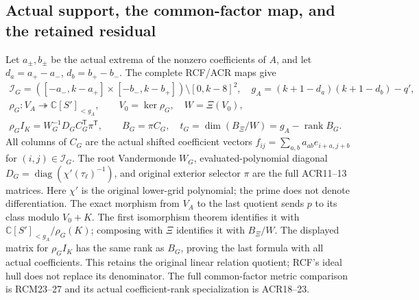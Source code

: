 \documentclass[11pt,a4paper]{article}
\providecommand{\C}{\mathbb C}
\begin{document}
\subsection{Actual support, the common-factor map, and the retained residual}

Let $a_\pm,b_\pm$ be the actual extrema of the nonzero coefficients
of $A$, and let $d_a=a_+-a_-$, $d_b=b_+-b_-$.
The complete RCF/ACR maps give
\[
\begin{gathered}
 \mathcal I_G=
 ([-a_-,k-a_+]\times[-b_-,k-b_+])\setminus[0,k-8]^2,\quad
 g_A=(k+1-d_a)(k+1-d_b)-q',\\
 \rho_G:V_A\twoheadrightarrow\C[S']_{<g_A},\qquad
 V_0=\ker\rho_G,\quad W=\Xi(V_0),\\
 \rho_G I_K=W_G^{-1}D_GC_G^{\mathsf T}\pi^{\mathsf T},
 \qquad B_G=\pi C_G,\quad
 t_G=\dim(B_\Xi/W)=g_A-\operatorname{rank}B_G .
\end{gathered}\tag{PBR17}
\]
All columns of $C_G$ are the actual shifted coefficient vectors
$f_{ij}=\sum_{a,b}a_{ab}e_{i+a,j+b}$ for $(i,j)\in\mathcal I_G$.
The root Vandermonde $W_G$, evaluated-polynomial diagonal
$D_G=\operatorname{diag}(\chi'(\tau_\ell)^{-1})$, and original
exterior selector $\pi$ are the full ACR11--13 matrices.
Here $\chi'$ is the original lower-grid polynomial; the prime
does not denote differentiation.
The exact morphism from $V_A$ to the last quotient sends $p$ to
its class modulo $V_0+K$. The first isomorphism theorem identifies
it with $\C[S']_{<g_A}/\rho_G(K)$; composing with $\Xi$ identifies
it with $B_\Xi/W$. The displayed matrix for $\rho_G I_K$ has the
same rank as $B_G$, proving the last formula with all actual
coefficients. This retains the original linear relation quotient;
RCF's ideal hull does not replace its denominator. The full
common-factor metric comparison is RCM23--27 and its actual
coefficient-rank specialization is ACR18--23.
\end{document}

